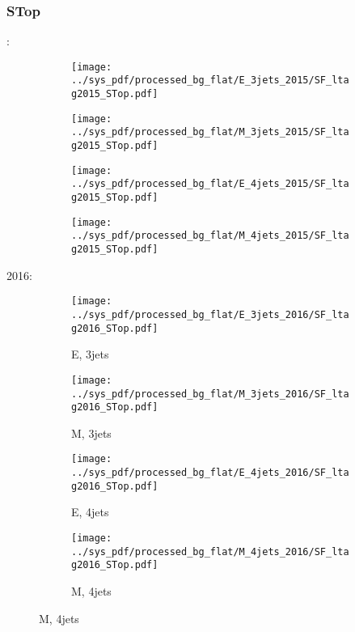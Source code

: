 \documentclass{beamer}
\begin{document}
\begin{frame}
\frametitle{STop}
\fontsize{5}{1}:
\begin{figure}
\centering
\begin{subfigure}[b]{0.24\textwidth}
\texttt{[image: ../sys\_pdf/processed\_bg\_flat/E\_3jets\_2015/SF\_ltag2015\_STop.pdf]}
\end{subfigure}
\begin{subfigure}[b]{0.24\textwidth}
\texttt{[image: ../sys\_pdf/processed\_bg\_flat/M\_3jets\_2015/SF\_ltag2015\_STop.pdf]}
\end{subfigure}
\begin{subfigure}[b]{0.24\textwidth}
\texttt{[image: ../sys\_pdf/processed\_bg\_flat/E\_4jets\_2015/SF\_ltag2015\_STop.pdf]}
\end{subfigure}
\begin{subfigure}[b]{0.24\textwidth}
\texttt{[image: ../sys\_pdf/processed\_bg\_flat/M\_4jets\_2015/SF\_ltag2015\_STop.pdf]}
\end{subfigure}
\end{figure}
2016:
\begin{figure}
\centering
\begin{subfigure}[b]{0.24\textwidth}
\texttt{[image: ../sys\_pdf/processed\_bg\_flat/E\_3jets\_2016/SF\_ltag2016\_STop.pdf]}
\captionsetup{font=tiny}
\caption{E, 3jets}
\end{subfigure}
\begin{subfigure}[b]{0.24\textwidth}
\texttt{[image: ../sys\_pdf/processed\_bg\_flat/M\_3jets\_2016/SF\_ltag2016\_STop.pdf]}
\captionsetup{font=tiny}
\caption{M, 3jets}
\end{subfigure}
\begin{subfigure}[b]{0.24\textwidth}
\texttt{[image: ../sys\_pdf/processed\_bg\_flat/E\_4jets\_2016/SF\_ltag2016\_STop.pdf]}
\captionsetup{font=tiny}
\caption{E, 4jets}
\end{subfigure}
\begin{subfigure}[b]{0.24\textwidth}
\texttt{[image: ../sys\_pdf/processed\_bg\_flat/M\_4jets\_2016/SF\_ltag2016\_STop.pdf]}
\captionsetup{font=tiny}
\caption{M, 4jets}
\end{subfigure}
\end{figure}
\end{frame}
\end{document}
